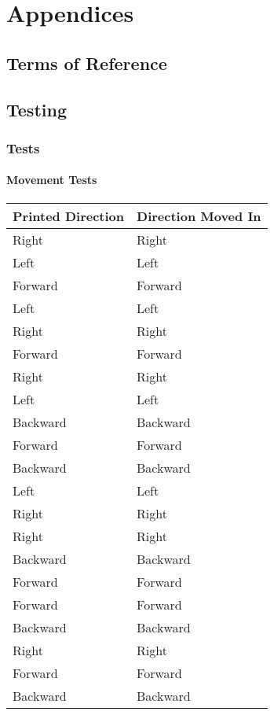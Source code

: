 \part{Appendices}
	\chapter{Terms of Reference}
	
	\chapter{Testing}
	\label{testingappendices}
		\section{Tests}
		\label{testing:testlogs}
			\begin{landscape}
				\subsection{Movement Tests}
				\begin{table}[h!]
					\centering
					\label{table:movementtestsbasic}
					\begin{tabular}{| l | l |} 
						\hline
						Printed Direction & Direction Moved In  \\ [0.5ex] 
						\hline
						Right & Right   \\
						Left & Left   \\ 
						Forward & Forward   \\ 
						Left & Left   \\ 
						Right & Right   \\ 
						Forward & Forward   \\ 
						Right & Right   \\ 
						Left & Left   \\ 
						Backward & Backward   \\ 
						Forward & Forward   \\ 
						Backward & Backward   \\ 
						Left & Left   \\ 
						Right & Right   \\ 
						Right & Right   \\ 
						Backward & Backward   \\ 
						Forward & Forward   \\ 
						Forward & Forward  \\ 
						Backward & Backward  \\ 
						Right & Right   \\ 
						Forward & Forward   \\ 
						Backward & Backward   \\ [1ex] 
						\hline
					\end{tabular}		
				\end{table}
			

\end{landscape}
